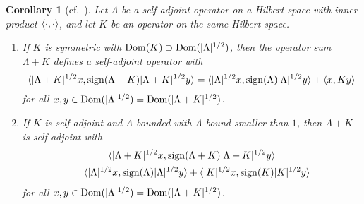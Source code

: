 \documentclass[11pt,a4paper]{amsart}
\numberwithin{equation}{section}
\DeclareMathOperator{\Dom}{Dom}
\DeclareMathOperator{\sign}{sign}
\DeclarePairedDelimiter{\abs}{|}{|}
\DeclarePairedDelimiter{\scprod}{\langle}{\rangle}
\theoremstyle{plain}
\newtheorem{corollary}[theorem]{Corollary}
\theoremstyle{definition}
\theoremstyle{remark}
\begin{document}
\begin{corollary}[{cf.~\cite[Lemma~2.2.7]{SchmDiss}}]\label{cor:formpert}
  Let $\Lambda$ be a self-adjoint operator on a Hilbert space with inner product $\scprod{\cdot , \cdot}$, and let $K$ be an
  operator on the same Hilbert space.

  \begin{enumerate}
    \renewcommand{\theenumi}{\alph{enumi}}

    \item
    If $K$ is symmetric with $\Dom(K) \supset \Dom(\abs{\Lambda}^{1/2})$, then the operator sum $\Lambda + K$ defines a
    self-adjoint operator with
    \begin{equation*}
      \scprod{ \abs{ \Lambda + K }^{1/2}x , \sign( \Lambda + K )\abs{ \Lambda + K}^{1/2}y }
      =
      \scprod{ \abs{\Lambda}^{1/2}x , \sign(\Lambda)\abs{\Lambda}^{1/2}y } + \scprod{ x, Ky }
    \end{equation*}
    for all $x,y \in \Dom(\abs{\Lambda}^{1/2}) = \Dom(\abs{\Lambda+K}^{1/2})$.

    \item
    If $K$ is self-adjoint and $\Lambda$-bounded with $\Lambda$-bound smaller than $1$, then $\Lambda + K$ is self-adjoint with
    \begin{multline*}
      \scprod{ \abs{ \Lambda + K }^{1/2}x , \sign( \Lambda + K )\abs{ \Lambda + K }^{1/2}y }\\
      =
      \scprod{ \abs{\Lambda}^{1/2}x , \sign(\Lambda)\abs{\Lambda}^{1/2}y } +
        \scprod{ \abs{K}^{1/2}x, \sign(K)\abs{K}^{1/2}y }
    \end{multline*}
    for all $x,y \in \Dom(\abs{\Lambda}^{1/2}) = \Dom(\abs{\Lambda+K}^{1/2})$.

  \end{enumerate}
\end{corollary}
\end{document}
